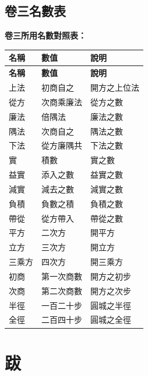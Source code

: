 \documentclass[11pt,a4paper]{article}
\begin{document}
\clearpage

\subsection{卷三名數表}
\noindent
\textbf{卷三所用名數對照表：}

\begin{center}
\begin{longtable}{|l|l|l|}
\hline
\textbf{名稱} & \textbf{數值} & \textbf{說明} \\
\hline
\endfirsthead
\hline
\textbf{名稱} & \textbf{數值} & \textbf{說明} \\
\hline
\endhead
上法 & 初商自之 & 開方之上位法 \\
\hline
從方 & 次商乘廉法 & 從方之數 \\
\hline
廉法 & 倍隅法 & 廉法之數 \\
\hline
隅法 & 次商自之 & 隅法之數 \\
\hline
下法 & 從方廉隅共 & 下法之數 \\
\hline
實 & 積數 & 實之數 \\
\hline
益實 & 添入之數 & 益實之數 \\
\hline
減實 & 減去之數 & 減實之數 \\
\hline
負積 & 負數之積 & 負積之數 \\
\hline
帶從 & 從方帶入 & 帶從之數 \\
\hline
平方 & 二次方 & 開平方 \\
\hline
立方 & 三次方 & 開立方 \\
\hline
三乘方 & 四次方 & 開三乘方 \\
\hline
初商 & 第一次商數 & 開方之初步 \\
\hline
次商 & 第二次商數 & 開方之次步 \\
\hline
半徑 & 一百二十步 & 圓城之半徑 \\
\hline
全徑 & 二百四十步 & 圓城之全徑 \\
\hline
\end{longtable}
\end{center}

\clearpage

\section*{跋}
\end{document}
